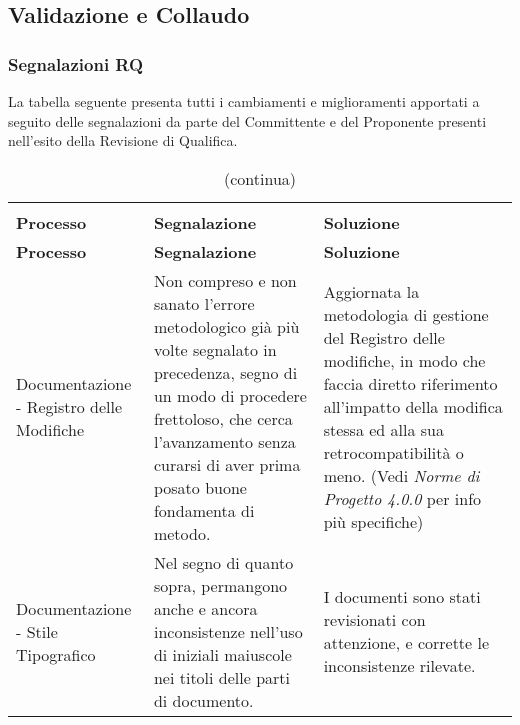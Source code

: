 		
	\subsection{Validazione e Collaudo}
		\subsubsection{Segnalazioni RQ}
			La tabella seguente presenta tutti i cambiamenti e miglioramenti apportati a seguito delle segnalazioni
			da parte del Committente e del Proponente presenti nell'esito della Revisione di Qualifica.
			
			\begin{longtable}{ 
					>{\centering}p{} 
					>{\centering}p{}
					>{\centering\arraybackslash}p{}}
				
				\rowcolor{white} \caption {Risoluzione segnalazioni RQ} \\
				
				\textbf{\color{white}Processo} &
				\textbf{\color{white}Segnalazione} &
				\textbf{\color{white}Soluzione}
				\endfirsthead
				
				\rowcolor{white}\caption[]{(continua)}\\
				\textbf{\color{white}Processo} &
				\textbf{\color{white}Segnalazione} &
				\textbf{\color{white}Soluzione}
				\endhead
				
				\hline \multicolumn{3}{c}{\textit{Continua nella prossima pagina}} \\
				\endfoot
				\hline
				\endlastfoot	
				
				
				Documentazione - Registro delle Modifiche
				&
				Non compreso e non sanato l’errore metodologico già più volte segnalato in precedenza, segno di un modo di procedere frettoloso, che cerca l’avanzamento senza curarsi di aver prima posato buone fondamenta di metodo.
				&
				Aggiornata la metodologia di gestione del Registro delle modifiche, in modo che faccia diretto riferimento all’impatto della modifica stessa ed alla sua retrocompatibilità o meno. (Vedi \textit{Norme di Progetto 4.0.0} per info più specifiche)
				\\
				
				
				Documentazione - Stile Tipografico
				&
				Nel segno di quanto sopra, permangono anche e ancora inconsistenze nell’uso di iniziali maiuscole nei titoli delle parti di documento. 
				&
				I documenti sono stati revisionati con attenzione, e corrette le inconsistenze rilevate. 
				\\
				

\end{longtable}
